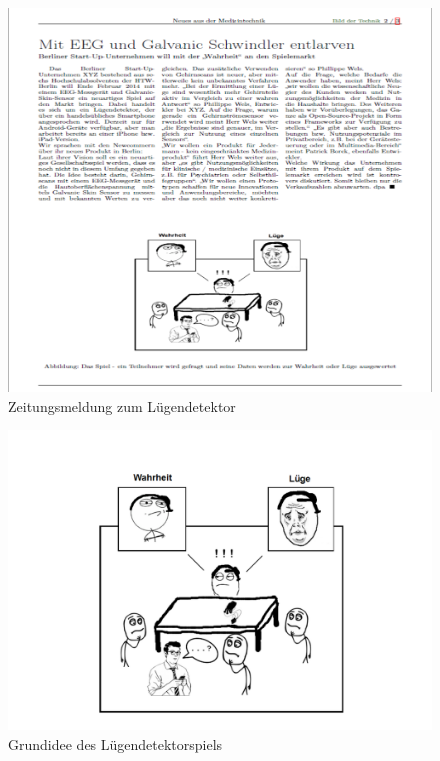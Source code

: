 \documentclass[10pt, a4paper, oneside, titlepage]{scrartcl} %
\begin{document}
	\begin{figure}[hbtp]
	\begin{center}	
	\begin{minipage}[t]{0,8\textwidth}
			\includegraphics[scale=0.63]{zeitungsmeldung_bild.png}
	\end{minipage}
	\end{center}	
	\caption[Zeitungsmeldung]{Zeitungsmeldung zum Lügendetektor}
	\label{fig:zeitung}
	\end{figure}
	
			
	\begin{figure}[ht!]
	\begin{center}
		\includegraphics[scale=0.45]{SessionImg.png}
	\end{center}	
	\caption[Das Spiel]{Grundidee des Lügendetektorspiels}
	\label{fig:session}
	\end{figure}
	
\end{document}
